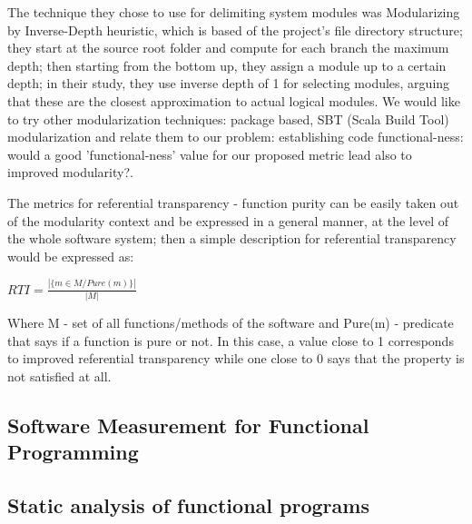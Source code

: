 \documentclass{article}
\begin{document}
The technique they chose to use for delimiting system modules  was Modularizing by  Inverse-Depth heuristic, which is based of the project's file directory structure; they start at the source root folder and compute for each branch the maximum depth; then starting from the bottom up, they assign a module up to a certain depth; in their study, they use inverse depth of 1 for selecting modules, arguing that these are the closest approximation to actual logical modules. We would like to try other modularization techniques: package based, SBT (Scala Build Tool)  modularization and relate them to our problem: establishing code functional-ness: would a good 'functional-ness' value for our proposed metric lead also to improved modularity?.\par

The metrics for referential transparency - function purity can be easily taken out of the modularity context and be expressed in a general manner, at the level of the whole software system; then a simple description for referential transparency would be expressed as:  \par
\begin{center}
\begin{math}
  RTI = \frac{ | \{ m \in M / Pure(m) \} | } { | M | }
\end{math}
\end{center}

Where  M - set of all functions/methods of the software and  Pure(m) - predicate that says if a function is pure or not. In this case, a value close to 1 corresponds to improved referential transparency while one close to 0 says that the property is not satisfied at all. \par


\subsection{Software Measurement for Functional Programming } 
\cite{Ryder04softwaremeasurement}

\subsection{Static analysis of functional programs}
\cite{DBLP:journals/infsof/BergB95}

\subsection{}
\end{document}
